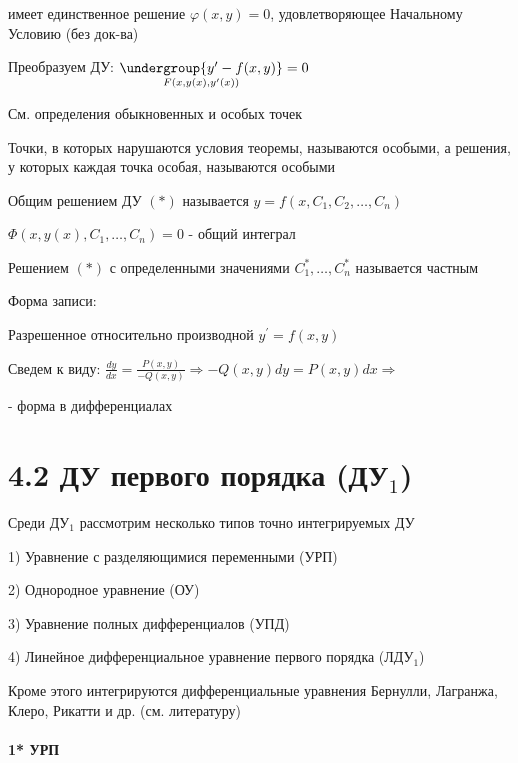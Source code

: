 \documentclass[12pt]{article}
\begin{document}
    имеет единственное решение $\varphi(x, y) = 0$, удовлетворяющее Начальному Условию (без док-ва)

    \Nota Преобразуем ДУ: $\underset{F(x, y(x), y^\prime(x))}{\undergroup{y^\prime - f(x, y)}} = 0$

    См. определения обыкновенных и особых точек

     Точки, в которых нарушаются условия теоремы, называются особыми, а решения, у которых каждая точка особая,
    называются особыми

     Общим решением ДУ $(*)$ называется $y = f(x, C_1, C_2, \dots, C_n)$

    \Nota $\Phi(x, y(x), C_1, \dots, C_n) = 0$ - общий интеграл

     Решением $(*)$ с определенными значениями $C_1^*, \dots, C_n^*$ называется частным

    \Nota Форма записи:

    Разрешенное относительно производной $y^\prime = f(x, y)$

    Сведем к виду: $\frac{dy}{dx} = \frac{P(x, y)}{-Q(x, y)} \Longrightarrow -Q(x, y)dy = P(x, y)dx \Longrightarrow $

     - форма в дифференциалах


    \section{4.2 ДУ первого порядка (ДУ$_1$)}

    \Nota Среди ДУ$_1$ рассмотрим несколько типов точно интегрируемых ДУ

    1) Уравнение с разделяющимися переменными (УРП)

    2) Однородное уравнение (ОУ)

    3) Уравнение полных дифференциалов (УПД)

    4) Линейное дифференциальное уравнение первого порядка (ЛДУ$_1$)

    Кроме этого интегрируются дифференциальные уравнения Бернулли, Лагранжа, Клеро, Рикатти и др. (см. литературу)

    \mediumvspace

    \hypertarget{equationwithseparablevariables}{}

    \paragraph{1* УРП}\mbox{}\\
\end{document}
